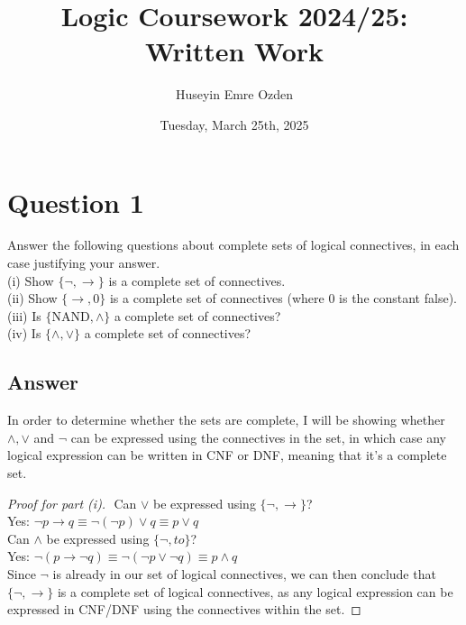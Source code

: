\documentclass[12pt]{fphw}
\title{Logic Coursework 2024/25: Written Work}
\author{Huseyin Emre Ozden}
\date{Tuesday, March 25th, 2025}
\institute{Durham University}
\begin{document}
\maketitle

\section*{Question 1}

\begin{problem}
  Answer the following questions about complete sets of logical connectives, in each case justifying your answer. \\
  (i) Show $\{\neg, \to \}$ is a complete set of connectives. \\
  (ii) Show $\{\to, 0\}$ is a complete set of connectives (where $0$ is the constant false). \\
  (iii) Is $\{ \text{NAND}, \wedge\}$ a complete set of connectives? \\
  (iv) Is $\{\wedge, \vee\}$ a complete set of connectives?
\end{problem}

\subsection*{Answer}

In order to determine whether the sets are complete, I will be showing whether $\wedge, \vee$ and $\neg$ can be expressed using the connectives in the set, in which case any logical expression can be written in CNF or DNF, meaning that it's a complete set.

\begin{proof}[Proof for part (i)] $ $ \newline
  Can $\vee$ be expressed using $\{\neg, \to \}$? \\
  Yes: $\neg p \to q \equiv \neg(\neg p) \vee q \equiv p \vee q$ \\
  Can $\wedge$ be expressed using $\{\neg, to \}$? \\
  Yes: $\neg(p \to \neg q) \equiv \neg (\neg p \vee \neg q) \equiv p \wedge q$ \\
  Since $\neg$ is already in our set of logical connectives, we can then conclude that $\{\neg, \to \}$ is a complete set of logical connectives, as any logical expression can be expressed in CNF/DNF using the connectives within the set.
\end{proof}
\end{document}

